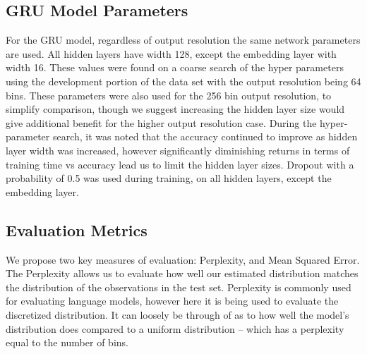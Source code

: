 \documentclass[11pt,letterpaper]{article}
\newcommand{\parencite}{\cite}
\begin{document}
\subsection{GRU Model Parameters}
For the GRU model, regardless of output resolution the same network parameters are used.
All hidden layers have width 128, except the embedding layer with width 16.
These values were found on a coarse search of the hyper parameters using the development portion of the data set with the output resolution being 64 bins.
These parameters were also used for the 256 bin output resolution, to simplify comparison, though we suggest increasing the hidden layer size would give additional benefit for the higher output resolution case.
During the hyper-parameter search, it was noted that the accuracy continued to improve as hidden layer width was increased,
however significantly diminishing returns in terms of training time vs accuracy lead us to limit the hidden layer sizes.
Dropout \parencite{srivastava2014dropout} with a probability of 0.5 was used during training, on all hidden layers, except the embedding layer.


\subsection{Evaluation Metrics}
We propose two key measures of evaluation: Perplexity, and Mean Squared Error.
The Perplexity allows us to evaluate how well our estimated distribution matches the distribution of the observations in the test set.
Perplexity is commonly used for evaluating language models, however here it is being used to evaluate the discretized distribution.
It can loosely be through of as to how well the model's distribution does compared to a uniform distribution -- which has a perplexity equal to the number of bins.
\end{document}
